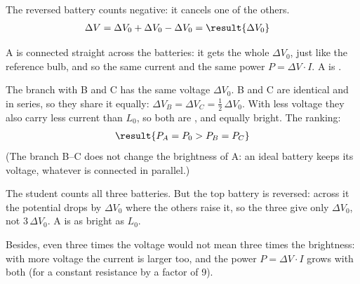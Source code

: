 \begin{abcliste}
\abc The reversed battery counts negative: it cancels one of the others.
\begin{align}
 \Delta V &= \Delta V_0 + \Delta V_0 - \Delta V_0 = \result{\Delta V_0}
\end{align}

\abc A is connected straight across the batteries: it gets the whole $\Delta V_0$, just like the reference bulb, and so the same current and the same power $P = \Delta V\cdot I$. A is .

The branch with B and C has the same voltage $\Delta V_0$. B and C are identical and in series, so they share it equally: $\Delta V_B = \Delta V_C = \frac{1}{2}\,\Delta V_0$. With less voltage they also carry less current than $L_0$, so both are , and equally bright. The ranking:
\begin{align}
 \result{P_A = P_0 > P_B = P_C}
\end{align}
(The branch B--C does not change the brightness of A: an ideal battery keeps its voltage, whatever is connected in parallel.)

\abc The student counts all three batteries. But the top battery is reversed: across it the potential drops by $\Delta V_0$ where the others raise it, so the three give only $\Delta V_0$, not $3\,\Delta V_0$. A is as bright as $L_0$.

Besides, even three times the voltage would not mean three times the brightness: with more voltage the current is larger too, and the power $P = \Delta V\cdot I$ grows with both (for a constant resistance by a factor of 9).
\end{abcliste}
